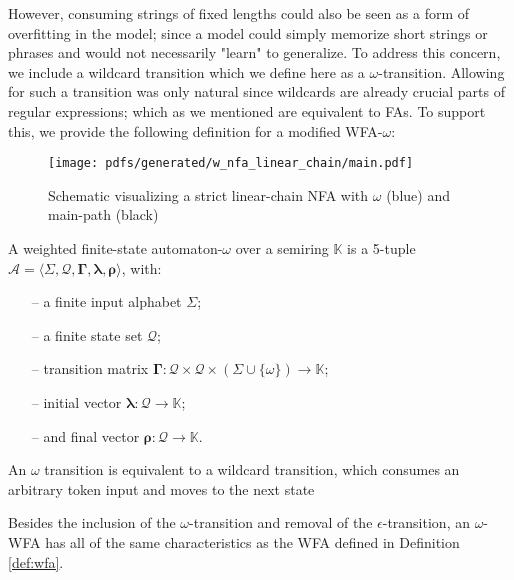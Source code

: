 However, consuming strings of fixed lengths could also be seen as a form of
overfitting in the model; since a model could simply memorize short strings or
phrases and would not necessarily "learn" to generalize. To address this
concern, we include a wildcard transition which we define here as a
$\omega$-transition. Allowing for such a transition was only natural since
wildcards are already crucial parts of regular expressions; which as we
mentioned are equivalent to FAs. To support this, we provide the following
definition for a modified WFA-$\omega$:

\begin{figure}[t]
  \centering
  \texttt{[image: pdfs/generated/w\_nfa\_linear\_chain/main.pdf]}
  \caption{Schematic visualizing a strict linear-chain NFA with
    $\omega$ (blue) and main-path (black)}
  \label{fig:omega_fa}
\end{figure}

\begin{definition}
  \label{def:wfa_w}
  A weighted finite-state automaton-$\omega$ over a semiring $\mathbb{K}$ is a
  5-tuple $\mathcal{A} = \langle \Sigma, \mathcal{Q}, \bm{\Gamma}, \bm{\lambda}, \bm{\rho}
  \rangle$, with:

  \begin{itemize}
  \itemsep0em
    \item[--] a finite input alphabet $\Sigma$;
    \item[--] a finite state set $\mathcal{Q}$;
    \item[--] transition matrix $\bm{\Gamma}: \mathcal{Q} \times \mathcal{Q} \times (\Sigma \cup \{\omega\}) \rightarrow \mathbb{K}$;
    \item[--] initial vector $\bm{\lambda}: \mathcal{Q} \rightarrow \mathbb{K}$;
    \item[--] and final vector $\bm{\rho}: \mathcal{Q} \rightarrow \mathbb{K}$.
  \end{itemize}

  \begin{remark}
    An $\omega$ transition is equivalent to a wildcard transition, which
    consumes an arbitrary token input and moves to the next state
  \end{remark}

  \begin{remark}
    Besides the inclusion of the $\omega$-transition and removal of the
    $\epsilon$-transition, an $\omega$-WFA has all of the same characteristics
    as the WFA defined in Definition \ref{def:wfa}.
  \end{remark}
\end{definition}

